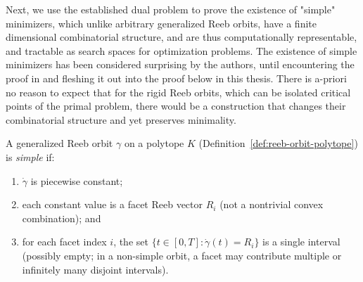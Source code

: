 %
%

Next, we use the established dual problem to prove the existence of "simple" minimizers, which unlike arbitrary generalized Reeb orbits, have a finite dimensional combinatorial structure, and are thus computationally representable, and tractable as search spaces for optimization problems.
The existence of simple minimizers has been considered surprising by the authors, until encountering the proof in \cite{HK2017} and fleshing it out into the proof below in this thesis.
There is a-priori no reason to expect that for the rigid Reeb orbits, which can be isolated critical points of the primal problem, there would be a construction that changes their combinatorial structure and yet preserves minimality.

\begin{definition}\label{def:simple-reeb-orbit}
A generalized Reeb orbit $\gamma$ on a polytope $K$
(Definition~\ref{def:reeb-orbit-polytope}) is \emph{simple} if:
\begin{enumerate}
\item $\dot{\gamma}$ is piecewise constant;
\item each constant value is a facet Reeb vector $R_i$
  (not a nontrivial convex combination); and
\item for each facet index $i$, the set
  $\{ t \in [0, T] : \dot{\gamma}(t) = R_i \}$
  is a single interval (possibly empty; in a non-simple orbit,
  a facet may contribute multiple or infinitely many disjoint intervals).
\end{enumerate}
\end{definition}

